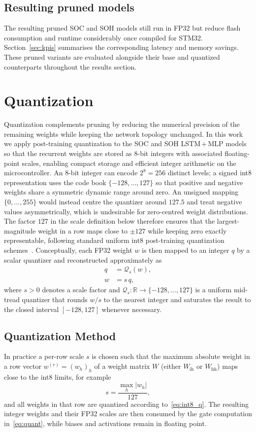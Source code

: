 \documentclass[final,3p,times]{elsarticle}
\begin{document}
\subsection{Resulting pruned models}
The resulting pruned SOC and SOH models still run in FP32 but reduce flash consumption and runtime considerably once compiled for STM32. Section~\ref{sec:kpis} summarises the corresponding latency and memory savings. These pruned variants are evaluated alongside their base and quantized counterparts throughout the results section.
\section{Quantization}
Quantization complements pruning by reducing the numerical precision of the remaining weights while keeping the network topology unchanged. In this work we apply post-training quantization to the SOC and SOH LSTM\,+\,MLP models so that the recurrent weights are stored as 8-bit integers with associated floating-point scales, enabling compact storage and efficient integer arithmetic on the microcontroller. An 8-bit integer can encode $2^8 = 256$ distinct levels; a signed int8 representation uses the code book $\{-128,\ldots,127\}$ so that positive and negative weights share a symmetric dynamic range around zero. An unsigned mapping $\{0,\ldots,255\}$ would instead centre the quantizer around $127.5$ and treat negative values asymmetrically, which is undesirable for zero-centred weight distributions. The factor $127$ in the scale definition below therefore ensures that the largest-magnitude weight in a row maps close to $\pm 127$ while keeping zero exactly representable, following standard uniform int8 post-training quantization schemes~\cite{jacobQuantizationTrainingNeural2017,krishnamoorthiQuantizingDeepConvolutional2018}. Conceptually, each FP32 weight $w$ is then mapped to an integer $q$ by a scalar quantizer and reconstructed approximately as
\begin{align}
    q &= \mathcal{Q}_s(w), \label{eq:int8_q}\\
    \hat{w} &= s\,q, \label{eq:int8_w}
\end{align}
where $s>0$ denotes a scale factor and $\mathcal{Q}_s : \mathbb{R} \rightarrow \{-128,\ldots,127\}$ is a uniform mid-tread quantizer that rounds $w/s$ to the nearest integer and saturates the result to the closed interval $[-128,127]$ whenever necessary.
\subsection{Quantization Method}
In practice a per-row scale $s$ is chosen such that the maximum absolute weight in a row vector $w^{(r)} = (w_h)_h$ of a weight matrix $W$ (either $W_{\mathrm{ih}}$ or $W_{\mathrm{hh}}$) maps close to the int8 limits, for example
\begin{equation}
    s = \frac{\max_h |w_h|}{127},
\end{equation}
and all weights in that row are quantized according to~\eqref{eq:int8_q}. The resulting integer weights and their FP32 scales are then consumed by the gate computation in~\eqref{eq:quant}, while biases and activations remain in floating point.
\end{document}
